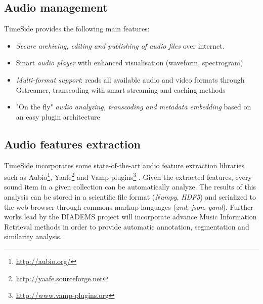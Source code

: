 \documentclass{paper}
\begin{document}



\subsection{Audio management}
TimeSide provides the following main features:
\begin{itemize}
\item \emph{Secure archiving, editing and publishing of audio files} over
  internet.
\item Smart \emph{audio player} with enhanced visualisation (waveform, spectrogram)
\item \emph{Multi-format support}: reads all available audio and video formats  through Gstreamer, transcoding with smart streaming and caching methods%
\item "On the fly" \emph{audio analyzing, transcoding and metadata
    embedding} based on an easy plugin architecture
\end{itemize}

\subsection{Audio features extraction}
TimeSide incorporates some state-of-the-art audio feature extraction libraries such as Aubio\footnote{\url{http://aubio.org/}}, Yaafe\footnote{\url{http://yaafe.sourceforge.net}} and Vamp plugins\footnote{ \url{http://www.vamp-plugins.org}} \cite{brossierPhD,yaafe_ISMIR2010,vamp-plugins}.
Given the extracted features, every sound item in a given collection can be automatically analyze. The results of this analysis can be stored in a scientific file format (\emph{Numpy}, \emph{HDF5}) and serialized to the web browser through commons markup languages (\emph{xml}, \emph{json}, \emph{yaml}).
Further works lead by the DIADEMS project will incorporate advance Music Information Retrieval methods in order to provide automatic annotation, segmentation and similarity analysis.
\end{document}
